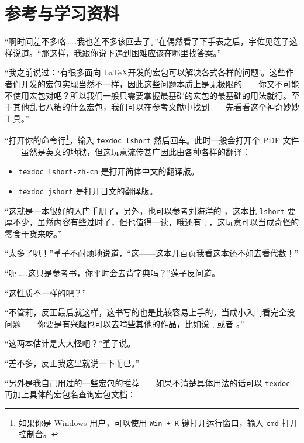 {\section{参考与学习资料}

“啊时间差不多咯……我也差不多该回去了。”在偶然看了下手表之后，宇佐见莲子这样说道。“那这样，我跟你说下遇到困难应该在哪里找答案。”

“我之前说过：‘有很多面向 \LaTeX 开发的宏包可以解决各式各样的问题’。这些作者们开发的宏包实现当然不一样，因此这些问题本质上是无极限的——你又不可能不使用宏包对吧？所以我们一般只需要掌握最基础的宏包的最基础的用法就行。至于其他乱七八糟的什么宏包，我们可以在参考文献中找到——先看看这个神奇妙妙工具。”

“打开你的命令行\footnote{如果你是 Windows 用户，可以使用 \texttt{Win + R} 键打开运行窗口，输入 \texttt{cmd} 打开控制台。}，输入 \verb"texdoc lshort" 然后回车。此时一般会打开个 PDF 文件 \citep[LShort]{oetiker2003not}
——虽然是英文的地狱，但这玩意流传甚广因此由各种各样的翻译：

\begin{itemize}
    \item  \verb"texdoc lshort-zh-cn" 是打开简体中文的翻译版。
    \item  \verb"texdoc jshort" 是打开日文的翻译版。
\end{itemize}

“这就是一本很好的入门手册了，另外，也可以参考刘海洋的 \citep[\LaTeX 入门]{刘海洋2013latex}，这本比 \verb"lshort" 要厚不少，虽然内容有些过时了，但也值得一读，哦还有 \citep[\LaTeX{} Reference Sheet for a thesis with KOMA-Script]{RSTL23KS}, \citep[现代 \LaTeX 入门讲座]{stonezeng}，这玩意可以当成奇怪的零食干货来吃。”

“太多了叭！”堇子不耐烦地说道，“这——这本几百页我看这本还不如去看代数！”

“呃……这只是参考书，你平时会去背字典吗？”莲子反问道。

“这性质不一样的吧？”

“不管莉，反正最后就这样，这书写的也是比较容易上手的，当成小入门看完全没问题——你要是有兴趣也可以去啃些其他的作品，比如说 \citep[The \LaTeX{} Companion. Second Edition]{mittelbach2004latex}, 或者 \citep[The \TeX book]{knuth1984texbook}。”

“这两本估计是大大怪吧？”堇子说。

“差不多，反正我这里就说一下而已。”

“另外是我自己用过的一些宏包的推荐——如果不清楚具体用法的话可以 \verb"texdoc" 再加上具体的宏包名查询宏包文档：

}

